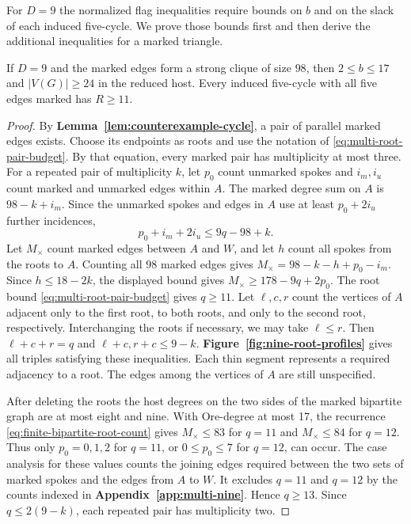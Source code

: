 For $D=9$ the normalized flag inequalities require bounds on $b$
and on the slack of each induced five-cycle. We prove those bounds
first and then derive the additional inequalities for a marked triangle.

\begin{lemma}\label{lem:finite-nine}
If $D=9$ and the marked edges form a strong clique of size $98$, then
$2\leq b\leq17$ and $|V(G)|\geq24$ in the reduced host. Every induced
five-cycle with all five edges marked has $R\geq11$.
\end{lemma}

\begin{proof}
By \textbf{Lemma~\ref{lem:counterexample-cycle}}, a pair of parallel
marked edges exists. Choose its endpoints as roots and use the notation
of \eqref{eq:multi-root-pair-budget}. By that equation, every marked pair has
multiplicity at most three. For a repeated pair of multiplicity $k$,
let $p_0$ count unmarked spokes and $i_m,i_u$ count marked and
unmarked edges within $A$. The marked degree sum on $A$ is
$98-k+i_m$. Since the unmarked spokes and edges in $A$ use at
least $p_0+2i_u$ further incidences,
\[
 p_0+i_m+2i_u\leq 9q-98+k .
\]
Let $M_\times$ count marked edges between $A$ and $W$, and let $h$
count all spokes from the roots to $A$. Counting all $98$ marked
edges gives $M_\times=98-k-h+p_0-i_m$. Since $h\leq18-2k$,
the displayed bound gives $M_\times\geq178-9q+2p_0$.
The root bound \eqref{eq:multi-root-pair-budget} gives $q\geq11$.
Let $\ell,c,r$ count the vertices of $A$ adjacent only to the first
root, to both roots, and only to the second root, respectively.
Interchanging the roots if necessary, we may take $\ell\le r$.
Then $\ell+c+r=q$ and $\ell+c,r+c\leq9-k$.
\textbf{Figure~\ref{fig:nine-root-profiles}} gives all triples
satisfying these inequalities. Each thin segment represents a required
adjacency to a root. The edges among the vertices of $A$ are still
unspecified.

After deleting the roots the host degrees on the two sides of the
marked bipartite graph are at most eight and nine. With Ore-degree
at most 17, the recurrence \eqref{eq:finite-bipartite-root-count}
gives $M_\times\leq83$ for $q=11$ and $M_\times\leq84$ for $q=12$.
Thus only $p_0=0,1,2$ for $q=11$, or $0\leq p_0\leq7$ for $q=12$,
can occur. The case analysis for these values counts the joining edges
required between the two sets of marked spokes and the edges from $A$
to $W$. It excludes $q=11$ and $q=12$
by the counts indexed in \textbf{Appendix~\ref{app:multi-nine}}.
Hence $q\geq13$.
Since $q\leq2(9-k)$, each repeated pair has multiplicity two.

\end{proof}
